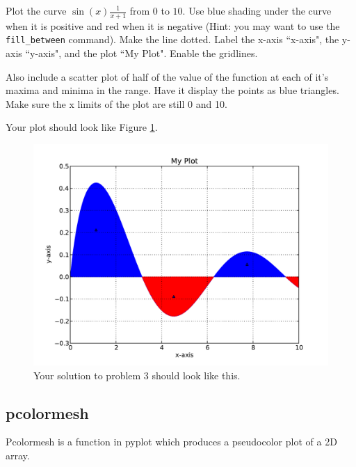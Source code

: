 \begin{problem} Plot the curve $\sin(x)\frac{1}{x+1}$ from $0$ to $10$.
Use blue shading under the curve when it is positive and red when it is
negative (Hint: you may want to use the \verb!fill_between! command).
Make the line dotted. Label the x-axis ``x-axis", the y-axis ``y-axis",
and the plot ``My Plot". Enable the gridlines.

Also include a scatter plot of half of the value of the function at each
of it's maxima and minima in the range. Have it display the points as
blue triangles. Make sure the x limits of the plot are still 0 and 10.

Your plot should look like Figure \ref{mpl:problem3}.
\end{problem}

\begin{figure}
\includegraphics[width=\textwidth]{prob3.pdf}
\caption{Your solution to problem 3 should look like this.}
\label{mpl:problem3} 
\end{figure}

\subsection*{pcolormesh}
Pcolormesh is a function in pyplot which produces a pseudocolor plot of a 2D array. 

